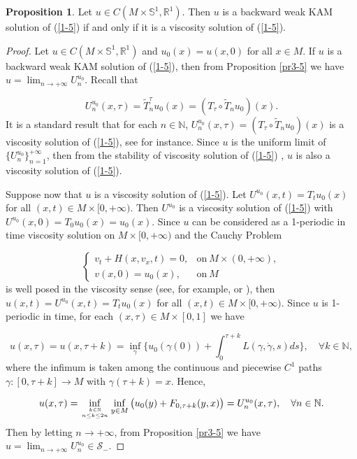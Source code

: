 \documentclass{amsart}[12pt]
\theoremstyle{definition}
\newtheorem{proposition}[theorem]{Proposition}
\theoremstyle{remark}
\numberwithin{equation}{section}
\begin{document}
\begin{proposition}\label{pr3-6}
Let $u\in C(M\times\mathbb{S}^1,\mathbb{R}^1)$. Then $u$ is a
backward weak KAM solution of (\ref{1-5}) if and only if it is a
viscosity solution of (\ref{1-5}).
\end{proposition}

\begin{proof}
Let $u\in C(M\times\mathbb{S}^1,\mathbb{R}^1)$ and $u_0(x)=u(x,0)$
for all $x\in M$. If $u$ is a backward weak KAM solution of
(\ref{1-5}), then from Proposition \ref{pr3-5} we have
$u=\lim_{n\to+\infty}U^{u_0}_n$. Recall that

\[
U^{u_0}_n(x,\tau)=\tilde{T}^\tau_nu_0(x)=(T_\tau\circ\tilde{T}_nu_0)(x).
\]
It is a standard result that for each $n\in\mathbb{N}$,
$U^{u_0}_n(x,\tau)=(T_\tau\circ\tilde{T}_nu_0)(x)$ is a viscosity
solution of (\ref{1-5}), see \cite{Fat5} for instance. Since $u$
is the uniform limit of $\{U^{u_0}_n\}_{n=1}^{+\infty}$, then from
the stability of viscosity solution of (\ref{1-5}) \cite{Fat-b},
$u$ is also a viscosity solution of (\ref{1-5}).

Suppose now that $u$ is a viscosity solution of (\ref{1-5}). Let
$U^{u_0}(x,t)=T_tu_0(x)$ for all $(x,t)\in M\times[0,+\infty)$.
Then $U^{u_0}$ is a viscosity solution of (\ref{1-5}) with
$U^{u_0}(x,0)=T_0u_0(x)=u_0(x)$. Since $u$ can be considered as a
1-periodic in time viscosity solution on $M\times[0,+\infty)$ and
the Cauchy Problem

\[
\left\{
        \begin{array}{ll}
        v_t+H(x,v_x,t)=0, & \mathrm{on}\ M\times(0,+\infty),\\
        v(x,0)=u_0(x), & \mathrm{on}\ M
                         \end{array}
                         \right.
\]
is well posed in the viscosity sense (see, for example,
\cite{Lio82} or \cite{Ber04}), then
$u(x,t)=U^{u_0}(x,t)=T_tu_0(x)$ for all $(x,t)\in
M\times[0,+\infty)$. Since $u$ is 1-periodic in time, for each
$(x,\tau)\in M\times[0,1]$ we have

\[
u(x,\tau)=u(x,\tau+k)=\inf_\gamma\{u_0(\gamma(0))+\int_0^{\tau+k}L(\gamma,\dot{\gamma},s)ds\}, \quad \forall k\in\mathbb{N},
\]
where the infimum is taken among the
continuous and piecewise $C^1$ paths $\gamma:[0,\tau+k]\to M$ with
$\gamma(\tau+k)=x$. Hence,

\[
u(x,\tau)=\inf_{k\in\mathbb{N} \atop n\leq k\leq
2n}\inf_{y\in M}\big(u_0(y)+F_{0,\tau+k}(y,x)\big)=U^{u_0}_n(x,\tau),\quad \forall n\in\mathbb{N}.
\]
Then by letting $n\to+\infty$, from Proposition \ref{pr3-5} we have
$u=\lim_{n\to+\infty}U^{u_0}_n\in\mathcal{S}_-$.

\end{proof}
\end{document}
